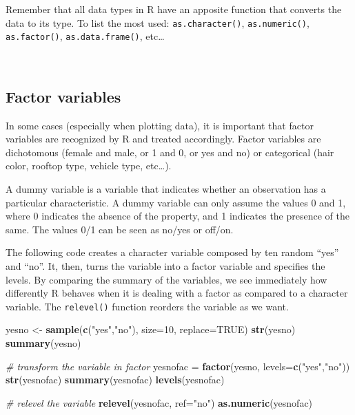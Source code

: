 \documentclass[
]{svmono}
\newenvironment{Shaded}{\begin{snugshade}}{\end{snugshade}}
\newcommand{\AttributeTok}[1]{\textcolor[rgb]{0.13,0.29,0.53}{#1}}
\newcommand{\CommentTok}[1]{\textcolor[rgb]{0.56,0.35,0.01}{\textit{#1}}}
\newcommand{\ConstantTok}[1]{\textcolor[rgb]{0.56,0.35,0.01}{#1}}
\newcommand{\DecValTok}[1]{\textcolor[rgb]{0.00,0.00,0.81}{#1}}
\newcommand{\FunctionTok}[1]{\textcolor[rgb]{0.13,0.29,0.53}{\textbf{#1}}}
\newcommand{\NormalTok}[1]{#1}
\newcommand{\OtherTok}[1]{\textcolor[rgb]{0.56,0.35,0.01}{#1}}
\newcommand{\StringTok}[1]{\textcolor[rgb]{0.31,0.60,0.02}{#1}}
\begin{document}
Remember that all data types in R have an apposite function that
converts the data to its type. To list the most used: \texttt{as.character()},
\texttt{as.numeric()}, \texttt{as.factor()}, \texttt{as.data.frame()}, etc\ldots{}

~

\hypertarget{factor-variables}{%
\subsection{Factor variables}\label{factor-variables}}

In some cases (especially when plotting data), it is important that
factor variables are recognized by R and treated accordingly. Factor
variables are dichotomous (female and male, or 1 and 0, or yes and no)
or categorical (hair color, rooftop type, vehicle type, etc\ldots).

A dummy variable is a variable that indicates whether an observation has
a particular characteristic. A dummy variable can only assume the values
0 and 1, where 0 indicates the absence of the property, and 1 indicates
the presence of the same. The values 0/1 can be seen as no/yes or
off/on.

The following code creates a character variable composed by ten random
``yes'' and ``no''. It, then, turns the variable into a factor variable and
specifies the levels. By comparing the summary of the variables, we see
immediately how differently R behaves when it is dealing with a factor
as compared to a character variable. The \texttt{relevel()} function reorders
the variable as we want.

\begin{Shaded}
\begin{Highlighting}[]
\NormalTok{yesno }\OtherTok{\textless{}{-}} \FunctionTok{sample}\NormalTok{(}\FunctionTok{c}\NormalTok{(}\StringTok{"yes"}\NormalTok{,}\StringTok{"no"}\NormalTok{), }\AttributeTok{size=}\DecValTok{10}\NormalTok{, }\AttributeTok{replace=}\ConstantTok{TRUE}\NormalTok{)}
\FunctionTok{str}\NormalTok{(yesno)}
\FunctionTok{summary}\NormalTok{(yesno)}

\CommentTok{\# transform the variable in factor}
\NormalTok{yesnofac }\OtherTok{=} \FunctionTok{factor}\NormalTok{(yesno, }\AttributeTok{levels=}\FunctionTok{c}\NormalTok{(}\StringTok{"yes"}\NormalTok{,}\StringTok{"no"}\NormalTok{))}
\FunctionTok{str}\NormalTok{(yesnofac)}
\FunctionTok{summary}\NormalTok{(yesnofac)}
\FunctionTok{levels}\NormalTok{(yesnofac)}

\CommentTok{\# relevel the variable}
\FunctionTok{relevel}\NormalTok{(yesnofac, }\AttributeTok{ref=}\StringTok{"no"}\NormalTok{)}
\FunctionTok{as.numeric}\NormalTok{(yesnofac)}
\end{Highlighting}
\end{Shaded}
\end{document}
